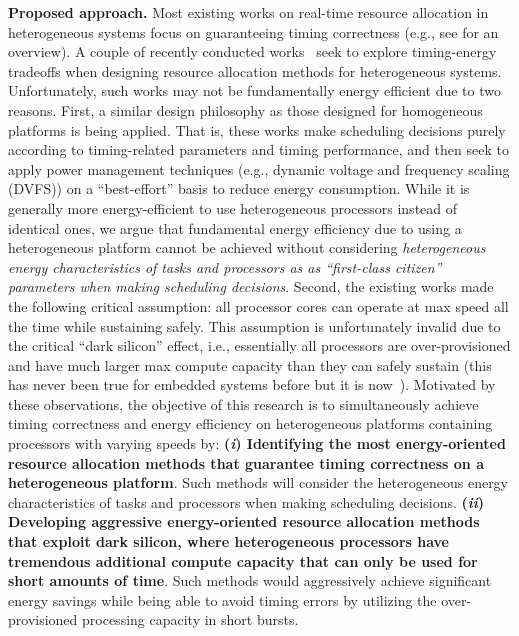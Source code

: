 \vspace{2mm} \noindent \textbf{Proposed approach.} 
Most existing works on real-time resource allocation in heterogeneous systems focus on guaranteeing timing correctness (e.g., see \cite{raravi2014task, raravi2013assigning, niemeier2011partitioned} for an overview). %
 A couple of recently conducted works~\cite{liuenergy, colin2014energy} seek to explore timing-energy tradeoffs when designing resource allocation methods for heterogeneous systems. 
 Unfortunately, such works may not be fundamentally energy efficient due to two reasons. First, a similar design philosophy as those designed for homogeneous platforms is being applied. That is, these works make scheduling decisions purely according to timing-related parameters and timing performance, and then seek to apply power management techniques (e.g., dynamic voltage and frequency scaling (DVFS)) on a ``best-effort'' basis to reduce energy consumption. While it is generally more energy-efficient to use heterogeneous processors instead of identical ones, we argue that fundamental energy efficiency due to using a heterogeneous platform cannot be achieved without considering \textit{heterogeneous energy characteristics of tasks and processors as as ``first-class citizen'' parameters when making scheduling decisions}. Second, the existing works made the following critical assumption: all processor cores can operate at max speed all the time while sustaining safely.
  This assumption is unfortunately invalid due to the critical ``dark silicon'' effect, i.e., essentially all processors are over-provisioned and have much larger max compute capacity than they can safely sustain (this has never been true for embedded systems before but it is now~\cite{?}). Motivated by these observations, the objective of this research is to simultaneously achieve timing correctness and energy efficiency on heterogeneous platforms containing processors with varying speeds by: \textbf{(\textit{i}) Identifying the most energy-oriented resource allocation methods that guarantee timing correctness on a heterogeneous platform}. Such methods will consider the heterogeneous energy characteristics of tasks and processors when making scheduling decisions.
   \textbf{(\textit{ii}) Developing aggressive energy-oriented resource allocation methods that exploit dark silicon, where heterogeneous processors have tremendous additional compute capacity that can only be used for short amounts of time}. Such methods would aggressively achieve significant energy savings while being able to avoid timing errors by utilizing the over-provisioned processing capacity in short bursts.
  
